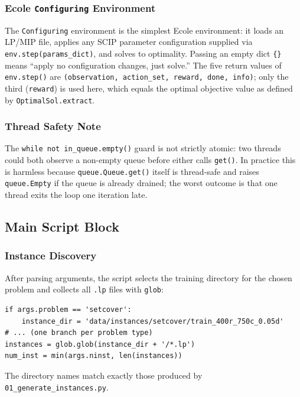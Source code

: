 \subsubsection{Ecole \texttt{Configuring} Environment}

The \texttt{Configuring} environment is the simplest Ecole environment: it loads an LP/MIP file, applies any SCIP parameter configuration supplied via \texttt{env.step(params\_dict)}, and solves to optimality. Passing an empty dict \texttt{\{\}} means ``apply no configuration changes, just solve.'' The five return values of \texttt{env.step()} are \texttt{(observation, action\_set, reward, done, info)}; only the third (\texttt{reward}) is used here, which equals the optimal objective value as defined by \texttt{OptimalSol.extract}.

\subsubsection{Thread Safety Note}

The \texttt{while not in\_queue.empty()} guard is not strictly atomic: two threads could both observe a non-empty queue before either calls \texttt{get()}. In practice this is harmless because \texttt{queue.Queue.get()} itself is thread-safe and raises \texttt{queue.Empty} if the queue is already drained; the worst outcome is that one thread exits the loop one iteration late.

\subsection{Main Script Block}

\subsubsection{Instance Discovery}

After parsing arguments, the script selects the training directory for the chosen problem and collects all \texttt{.lp} files with \texttt{glob}:

\begin{lstlisting}
if args.problem == 'setcover':
    instance_dir = 'data/instances/setcover/train_400r_750c_0.05d'
# ... (one branch per problem type)
instances = glob.glob(instance_dir + '/*.lp')
num_inst = min(args.ninst, len(instances))
\end{lstlisting}

The directory names match exactly those produced by \texttt{01\_generate\_instances.py}.

